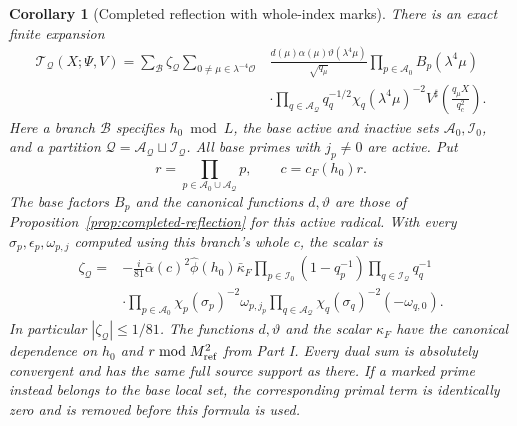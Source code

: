 \documentclass[11pt,a4paper]{article}
\numberwithin{equation}{section}
\numberwithin{figure}{section}
\newtheorem{corollary}[theorem]{Corollary}
\theoremstyle{definition}
\theoremstyle{remark}
\begin{document}
\begin{corollary}[Completed reflection with whole-index marks]
There is an exact finite expansion
\begin{equation}\label{eq:marked-reflection}
 \begin{split}
 \mathcal T_{\mathcal Q}(X;\Psi,V)
 =\sum_{\mathcal B}\zeta_{\mathcal Q}
 \sum_{0\ne\mu\in\lambda^{-4}\mathcal O}
 &\frac{d(\mu)\alpha(\mu)\vartheta(\lambda^4\mu)}{\sqrt{q_\mu}}
 \prod_{p\in\mathcal A_0}B_p(\lambda^4\mu)\\
 &\cdot\prod_{q\in\mathcal A_{\mathcal Q}}
       q_q^{-1/2}\chi_q(\lambda^4\mu)^{-2}
 V^\sharp\!\left(\frac{q_\mu X}{q_c^2}\right).
 \end{split}
\end{equation}
Here a branch \(\mathcal B\) specifies \(h_0\bmod L\), the base active and
inactive sets \(\mathcal A_0,\mathcal I_0\), and a partition
\(\mathcal Q=\mathcal A_{\mathcal Q}\sqcup\mathcal I_{\mathcal Q}\).
All base primes with \(j_p\ne0\) are active.  Put
\[
 r=\prod_{p\in\mathcal A_0\cup\mathcal A_{\mathcal Q}}p,
 \qquad c=c_F(h_0)r.
\]
The base factors \(B_p\) and the canonical functions \(d,\vartheta\) are
those of Proposition~\ref{prop:completed-reflection} for this active radical.
With every \(\sigma_p,\epsilon_p,\omega_{p,j}\) computed using this branch's
whole \(c\), the scalar is
\begin{equation}\label{eq:marked-reflection-phase}
 \begin{split}
 \zeta_{\mathcal Q}={}&-\frac{i}{81}\bar\alpha(c)^2
       \widehat\phi(h_0)\bar\kappa_F
       \prod_{p\in\mathcal I_0}(1-q_p^{-1})
       \prod_{q\in\mathcal I_{\mathcal Q}}q_q^{-1}\\
 &\cdot\prod_{p\in\mathcal A_0}\chi_p(\sigma_p)^{-2}\omega_{p,j_p}
       \prod_{q\in\mathcal A_{\mathcal Q}}
             \chi_q(\sigma_q)^{-2}(-\omega_{q,0}).
 \end{split}
\end{equation}
In particular \(|\zeta_{\mathcal Q}|\le1/81\).  The functions
\(d,\vartheta\) and the scalar \(\kappa_F\) have the canonical dependence
on \(h_0\) and \(r\bmod M_{\rm ref}^2\) from Part I.  Every dual sum is
absolutely convergent and has the same full source support as there.
If a marked prime instead belongs to the base local set, the corresponding
primal term is identically zero and is removed before this formula is used.
\end{corollary}
\end{document}
